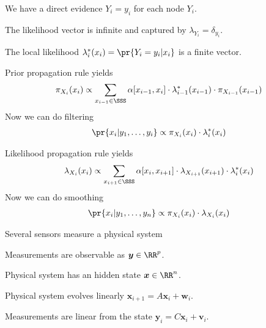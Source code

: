 \documentclass[landscape,footrule]{foils}
\renewcommand{\vec}[1]{\boldsymbol{#1}}
\begin{document}
\begin{triangles}
\item We have a direct evidence $Y_i=y_i$ for each node $Y_i$. 
\item The likelihood vector is infinite and captured by $\lambda_{Y_i}=\delta_{y_i}$.
\item The local likelihood $\lambda_i^*(x_i)=\pr{Y_i=y_i|x_i}$ is a finite vector. 
\end{triangles}


\enlargethispage{1cm}

\vspace*{-1.0cm}

Prior propagation rule yields
\begin{align*}
\pi_{X_i}(x_i)\propto \sum_{x_{i-1}\in \SSS} \alpha[x_{i-1}, x_i]\cdot\lambda_{i-1}^*(x_{i-1})\cdot \pi_{X_{i-1}}(x_{i-1})
\end{align*}
Now we can do filtering 
\begin{align*}
\pr{x_i|y_1,\ldots,y_{i}}\propto \pi_{X_i}(x_i)\cdot\lambda_i^*(x_i)
\end{align*}

\enlargethispage{1cm}

\vspace*{-1.0cm}

Likelihood propagation rule yields
\begin{align*}
\lambda_{X_i}(x_i)\propto \sum_{x_{i+1}\in \SSS} \alpha[x_{i}, x_{i+1}]\cdot\lambda_{X_{i+1}}(x_{i+1})\cdot \lambda_{i}^*(x_{i})
\end{align*}
Now we can do smoothing 
\begin{align*}
\pr{x_i|y_1,\ldots,y_{n}}\propto \pi_{X_i}(x_i)\cdot\lambda_{X_i}(x_i)
\end{align*}






Several sensors measure a physical system
\begin{triangles}
\item Measurements are observable as $\vec{y}\in\RR^p$.
\item Physical system has an hidden state $\vec{x}\in\RR^n$.
\item Physical system evolves linearly $\vec{x}_{i+1}=A\vec{x}_i+\vec{w}_i$.
\item Measurements are linear from the state $\vec{y}_{i}=C\vec{x}_i+\vec{v}_i$.
\end{triangles}
\vspace*{1cm}
\end{document}
